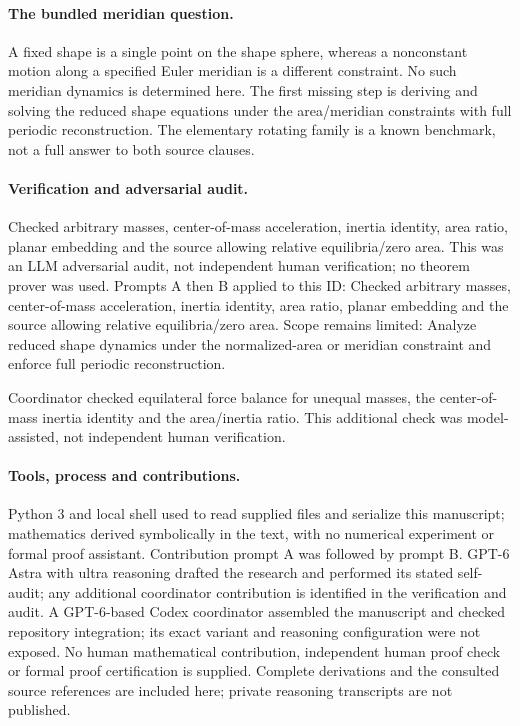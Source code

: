 \documentclass[11pt]{article}
\begin{document}
\paragraph{The bundled meridian question.}A fixed shape is a single point on the shape sphere, whereas a nonconstant motion along a specified Euler meridian is a different constraint. No such meridian dynamics is determined here. The first missing step is deriving and solving the reduced shape equations under the area/meridian constraints with full periodic reconstruction. The elementary rotating family is a known benchmark, not a full answer to both source clauses.

\paragraph{Verification and adversarial audit.}
Checked arbitrary masses, center-of-mass acceleration, inertia identity, area ratio, planar embedding and the source allowing relative equilibria/zero area. This was an LLM adversarial audit, not independent human verification; no theorem prover was used. Prompts A then B applied to this ID: Checked arbitrary masses, center-of-mass acceleration, inertia identity, area ratio, planar embedding and the source allowing relative equilibria/zero area. Scope remains limited: Analyze reduced shape dynamics under the normalized-area or meridian constraint and enforce full periodic reconstruction.

Coordinator checked equilateral force balance for unequal masses, the center-of-mass inertia identity and the area/inertia ratio. This additional check was model-assisted, not independent human verification.

\paragraph{Tools, process and contributions.}
Python 3 and local shell used to read supplied files and serialize this manuscript; mathematics derived symbolically in the text, with no numerical experiment or formal proof assistant. Contribution prompt A was followed by prompt B. GPT-6 Astra with ultra reasoning drafted the research and performed its stated self-audit; any additional coordinator contribution is identified in the verification and audit. A GPT-6-based Codex coordinator assembled the manuscript and checked repository integration; its exact variant and reasoning configuration were not exposed. No human mathematical contribution, independent human proof check or formal proof certification is supplied. Complete derivations and the consulted source references are included here; private reasoning transcripts are not published.
\end{document}
